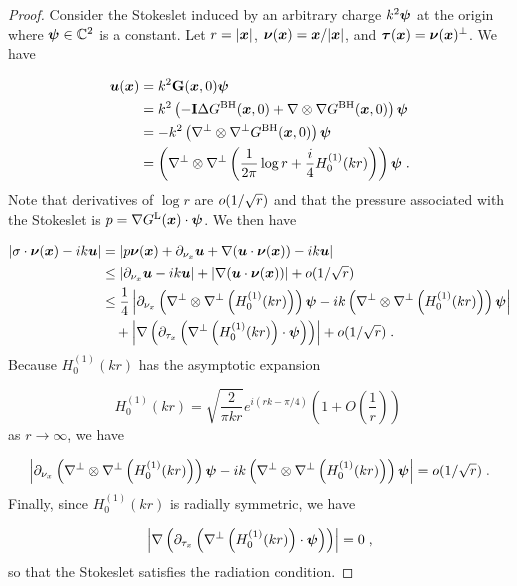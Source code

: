 \begin{proof}
Consider the Stokeslet induced by an arbitrary charge
$k^2 {\boldsymbol \psi}$ at the origin where ${\boldsymbol \psi} \in \mathbb{C}^2$ 
is a constant. Let $r = |{\boldsymbol x}|$,
${\boldsymbol \nu}({\boldsymbol x}) = {\boldsymbol x}/|{\boldsymbol x}|$, and ${\boldsymbol \tau}({\boldsymbol x}) = {\boldsymbol \nu}({\boldsymbol x})^\perp$. We have

\begin{align*}
{\boldsymbol u} ({\boldsymbol x}) &= k^2 {\bf G}({\boldsymbol x},0) {\boldsymbol \psi} \\
&= k^2 \left (-{\bf I} \Delta G^{\textrm{BH}}({\boldsymbol x},0)
+ \nabla \otimes \nabla G^{\textrm{BH}}({\boldsymbol x},0)\right ) {\boldsymbol \psi} \\
&= -k^2 \left (\nabla^\perp \otimes \nabla^\perp G^{\textrm{BH}}({\boldsymbol x},0) \right) {\boldsymbol \psi} \\
&= \left(\nabla^\perp \otimes \nabla^\perp \left ( \frac{1}{2\pi}
\log r + \frac{i}{4} H_0^{(1)} (kr) \right ) \right){\boldsymbol \psi} \; .
\end{align*}
Note that derivatives of $\log r$ are $o (1/\sqrt{r})$
and that the pressure associated with the Stokeslet is
$p = \nabla G^{\textrm{L}}({\boldsymbol x}) \cdot {\boldsymbol \psi}$. We then have

\begin{align*}
\left | \sigma \cdot {\boldsymbol \nu}({\boldsymbol x}) - i k {\boldsymbol u} \right | &=
\left | p {\boldsymbol \nu}({\boldsymbol x}) + \partial_{{\nu_x}} {\boldsymbol u} + \nabla ({\boldsymbol u} \cdot {\boldsymbol \nu}({\boldsymbol x}))
- ik {\boldsymbol u} \right | \\
&\leq \left | \partial_{{\nu_x}} {\boldsymbol u} - ik{\boldsymbol u} \right | + \left | \nabla({\boldsymbol u} \cdot {\boldsymbol \nu}({\boldsymbol x})) \right |
+ o (1/\sqrt{r}) \\
&\leq \frac{1}{4} \left | \partial_{{\nu_x}} \left(\nabla^\perp \otimes
\nabla^\perp \left (H_0^{(1)} (kr) \right ) \right){\boldsymbol \psi}
- i k \left(\nabla^\perp \otimes \nabla^\perp
\left (H_0^{(1)} (kr) \right ) \right){\boldsymbol \psi} \right | \\
& \quad + \left | \nabla \left( \partial_{\tau_x} \left ( 
\nabla^\perp \left (H_0^{(1)} (kr) \right ) \cdot {\boldsymbol \psi}  \right )
\right) \right | + o (1/\sqrt{r}) \; .
\end{align*}
Because $H_0^{(1)}(kr)$ has the asymptotic expansion 

\begin{equation}
H_0^{(1)}(kr) = \sqrt{\frac{2}{\pi k r}} e^{i(rk-\pi/4)} \left ( 1 + O\left (
\frac{1}{r} \right ) \right ) \; \nonumber
\end{equation}
as $r\to \infty$, we have

\begin{equation}
\left | \partial_{{\nu_x}} \left(\nabla^\perp \otimes
\nabla^\perp \left (H_0^{(1)} (kr) \right ) \right){\boldsymbol \psi}
- ik \left(\nabla^\perp \otimes \nabla^\perp
\left (H_0^{(1)} (kr) \right ) \right){\boldsymbol \psi} \right | =
o ( 1/\sqrt{r} ) \; . \nonumber
\end{equation}
Finally, since $H_0^{(1)}(kr)$ is radially symmetric,
we have

\begin{equation}
\left | \nabla \left( \partial_{\tau_x} \left ( 
\nabla^\perp \left (H_0^{(1)} (kr) \right ) \cdot {\boldsymbol \psi}  \right )
\right) \right | = 0 \; , \nonumber
\end{equation}
so that the Stokeslet satisfies the radiation condition.
\end{proof}
